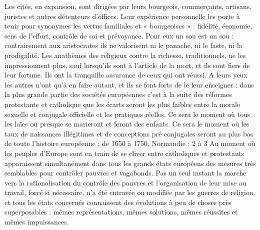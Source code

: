  Les cités, en expansion, sont dirigées par leurs bourgeois, commerçants, artisans, juristes et autres détenteurs d'offices. Leur expérience personnelle les porte à tenir pour synonymes les vertus familiales et « bourgeoises » : fidélité, économie, sens de l'effort, contrôle de soi et prévoyance. Pour eux un sou est un sou : contrairement aux aristocrates ils ne valorisent ni le panache, ni le faste, ni la prodigalité. Les anathèmes des religieux contre la richesse, traditionnels, ne les impressionnent plus, sauf lorsqu'ils sont à l'article de la mort, et ils sont fiers de leur fortune. Ils ont la tranquille assurance de ceux qui ont réussi. A leurs yeux les autres n'ont qu'à en faire autant, et ils se font forts de le leur enseigner : dans la plus grande partie des sociétés européennes c'est à la suite des réformes protestante et catholique que les écarts seront les plus faibles entre la morale sexuelle et conjugale officielle et les pratiques réelles. Ce sera le moment où tous les laïcs ou presque se marieront et feront des enfants. Ce sera le moment où les taux de naissances illégitimes et de conceptions pré conjugales seront au plus bas de toute l'histoire européenne : de 1650 à 1750, Normandie : 2 à 3 %
 Au moment où les peuples d'Europe sont en train de se cliver entre catholiques et protestants apparaissent simultanément dans tous les grands états européens des mesures très semblables pour contrôler pauvres et vagabonds. Pas un seul instant la marche vers la rationalisation du contrôle des pauvres et l'organisation de leur mise au travail, forcé si nécessaire, n'a été entravée ou modifiée par les guerres de religion, et tous les états concernés connaissent des évolutions à peu de choses près superposables : mêmes représentations, mêmes solutions, mêmes réussites et mêmes impuissances. 
